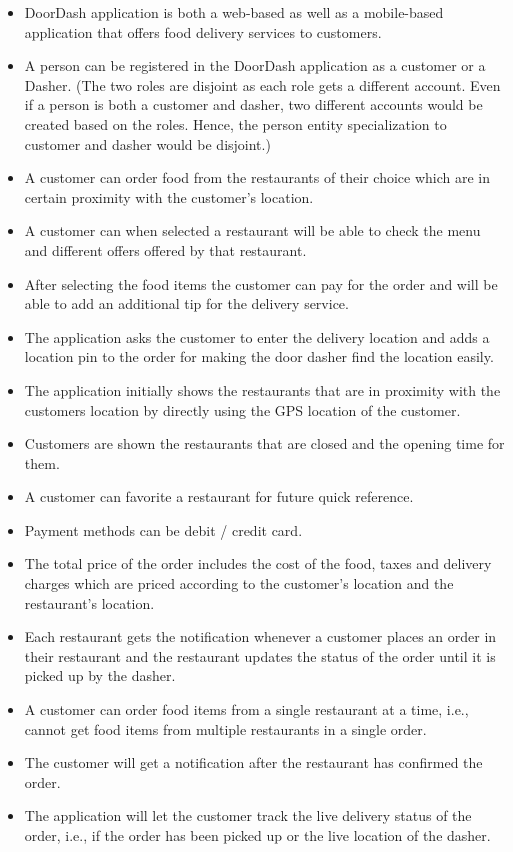 \documentclass[12pt,letterpaper]{article}
\begin{document}
\begin{itemize}
    \item DoorDash application is both a web-based as well as a mobile-based application that offers food delivery services to customers.
    \item A person can be registered in the DoorDash application as a customer or a Dasher. (The two roles are disjoint as each role gets a different account. Even if a person is both a customer and dasher, two different accounts would be created based on the roles. Hence, the person entity specialization to customer and dasher would be disjoint.)
    \item A customer can order food from the restaurants of their choice which are in certain proximity with the customer’s location.
    \item A customer can when selected a restaurant will be able to check the menu and different offers offered by that restaurant.
    \item After selecting the food items the customer can pay for the order and will be able to add an additional tip for the delivery service.
    \item The application asks the customer to enter the delivery location and adds a location pin to the order for making the door dasher find the location easily.
    \item The application initially shows the restaurants that are in proximity with the customers location by directly using the GPS location of the customer.
    \item Customers are shown the restaurants that are closed and the opening time for them.
    \item A customer can favorite a restaurant for future quick reference.
    \item Payment methods can be debit / credit card.
    \item The total price of the order includes the cost of the food, taxes and delivery charges which are priced according to the customer’s location and the restaurant’s location.
    \item Each restaurant gets the notification whenever a customer places an order in their restaurant and the restaurant updates the status of the order until it is picked up by the dasher. 
    \item A customer can order food items from a single restaurant at a time, i.e., cannot get food items from multiple restaurants in a single order.
    \item The customer will get a notification after the restaurant has confirmed the order.
    \item The application will let the customer track the live delivery status of the order, i.e., if the order has been picked up or the live location of the dasher.
\end{itemize}
\end{document}
